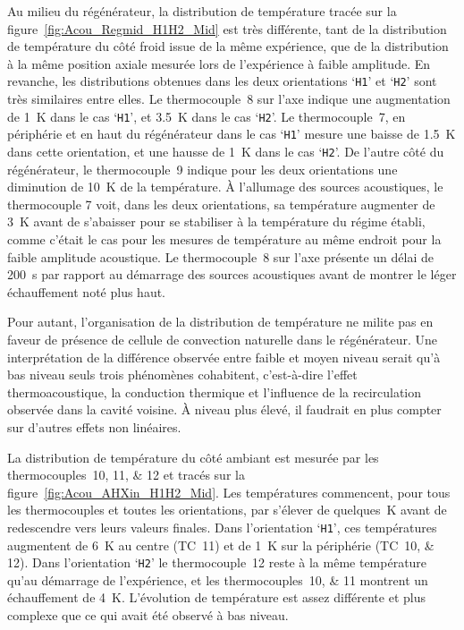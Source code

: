Au milieu du régénérateur, la distribution de température tracée sur la figure~\ref{fig:Acou_Regmid_H1H2_Mid} est très différente, tant de la distribution de température du côté froid issue de la même expérience, que de la distribution à la même position axiale mesurée lors de l'expérience à faible amplitude. En revanche, les distributions obtenues dans les deux orientations `\texttt{H1}' et `\texttt{H2}' sont très similaires entre elles. Le thermocouple~\num{8} sur l'axe indique une augmentation de \qty{1}{\kelvin} dans le cas `\texttt{H1}', et \qty{3.5}{\kelvin} dans le cas `\texttt{H2}'. Le thermocouple~\num{7}, en périphérie et en haut du régénérateur dans le cas `\texttt{H1}' mesure une baisse de \qty{1.5}{\kelvin} dans cette orientation, et une hausse de \qty{1}{\kelvin} dans le cas `\texttt{H2}'. De l'autre côté du régénérateur, le thermocouple~\num{9} indique pour les deux orientations une diminution de \qty{10}{\kelvin} de la température. À l'allumage des sources acoustiques, le thermocouple \num{7} voit, dans les deux orientations, sa température augmenter de \qty{3}{\kelvin} avant de s'abaisser pour se stabiliser à la température du régime établi, comme c'était le cas pour les mesures de température au même endroit pour la faible amplitude acoustique. Le thermocouple~\num{8} sur l'axe présente un délai de \qty{200}{\second} par rapport au démarrage des sources acoustiques avant de montrer le léger échauffement noté plus haut.


Pour autant, l'organisation de la distribution de température ne milite pas en faveur de présence de cellule de convection naturelle dans le régénérateur. Une interprétation de la différence observée entre faible et moyen niveau serait qu'à bas niveau seuls trois phénomènes cohabitent, c'est-à-dire l'effet thermoacoustique, la conduction thermique et l'influence de la recirculation observée dans la cavité voisine. À niveau plus élevé, il faudrait en plus compter sur d'autres effets non linéaires.\medskip

La distribution de température du côté ambiant est mesurée par les thermocouples~\numlist{10;11;12} et tracés sur la figure~\ref{fig:Acou_AHXin_H1H2_Mid}. Les températures commencent, pour tous les thermocouples et toutes les orientations, par s'élever de quelques~\unit{\kelvin} avant de redescendre vers leurs valeurs finales. Dans l'orientation `\texttt{H1}', ces températures augmentent de \qty{6}{\kelvin} au centre (TC~\num{11}) et de \qty{1}{\kelvin} sur la périphérie (TC~\numlist{10;12}). Dans l'orientation `\texttt{H2}' le thermocouple~\num{12} reste à la même température qu'au démarrage de l'expérience, et les thermocouples~\numlist{10;11} montrent un échauffement de \qty{4}{\kelvin}. L'évolution de température est assez différente et plus complexe que ce qui avait été observé à bas niveau.\smallskip

